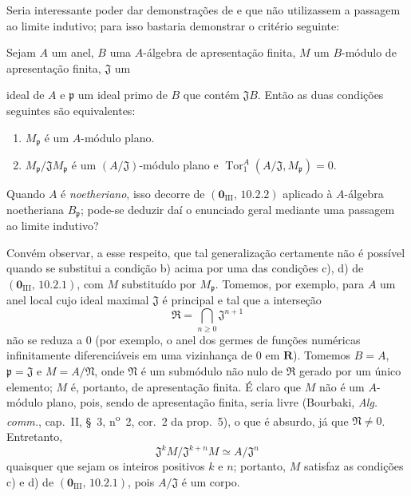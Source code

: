 \begin{remark}[11.3.12]
\label{IV.11.3.12}
Seria interessante poder dar demonstrações
de  e 
que não utilizassem a passagem ao limite
indutivo; para isso bastaria demonstrar o
critério seguinte:

Sejam $A$ um anel, $B$ uma $A$-álgebra
de apresentação finita, $M$ um
$B$-módulo de apresentação finita,
$\mathfrak J$ um


ideal de $A$ e $\mathfrak p$ um ideal
primo de $B$ que contém $\mathfrak JB$.
Então as duas condições seguintes são
equivalentes:
\begin{enumerate}[label=\emph{\alph*)}]
\item $M_{\mathfrak p}$ é um
$A$-módulo plano.
\item $M_{\mathfrak p}/\mathfrak J
M_{\mathfrak p}$ é um
$(A/\mathfrak J)$-módulo plano e
$\operatorname{Tor}_1^A
(A/\mathfrak J,M_{\mathfrak p})=0$.
\end{enumerate}
Quando $A$ é \emph{noetheriano},
isso decorre de
$(\mathbf 0_{\mathrm{III}},\,10.2.2)$
aplicado à $A$-álgebra noetheriana
$B_{\mathfrak p}$; pode-se deduzir daí
o enunciado geral mediante uma passagem
ao limite indutivo?

Convém observar, a esse respeito, que
tal generalização certamente não é
possível quando se substitui a condição
b) acima por uma das condições c), d)
de $(\mathbf 0_{\mathrm{III}},\,10.2.1)$,
com $M$ substituído por $M_{\mathfrak p}$.
Tomemos, por exemplo, para $A$ um anel
local cujo ideal maximal $\mathfrak J$
é principal e tal que a interseção
\[
\mathfrak R=\bigcap_{n\geq0}
\mathfrak J^{n+1}
\]
não se reduza a $0$ (por exemplo, o
anel dos germes de funções numéricas
infinitamente diferenciáveis em uma
vizinhança de $0$ em $\mathbf R$).
Tomemos $B=A$, $\mathfrak p=\mathfrak J$
e $M=A/\mathfrak N$, onde
$\mathfrak N$ é um submódulo não nulo
de $\mathfrak R$ gerado por um único
elemento; $M$ é, portanto, de
apresentação finita. É claro que
$M$ não é um $A$-módulo plano,
pois, sendo de apresentação finita,
seria livre (Bourbaki,
\emph{Alg. comm.}, cap.~II, \S~3,
n\textsuperscript{o}~2, cor.~2 da
prop.~5), o que é absurdo, já que
$\mathfrak N\neq0$. Entretanto,
\[
\mathfrak J^kM/\mathfrak J^{k+n}M
\simeq A/\mathfrak J^n
\]
quaisquer que sejam os inteiros
positivos $k$ e $n$; portanto,
$M$ satisfaz as condições c) e d)
de $(\mathbf 0_{\mathrm{III}},\,10.2.1)$,
pois $A/\mathfrak J$ é um corpo.
\end{remark}

